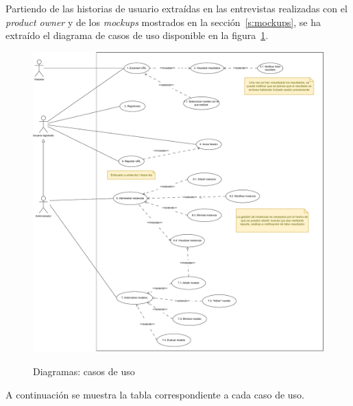 Partiendo de las historias de usuario extraídas en las entrevistas realizadas con el \textit{product owner} y de los \textit{mockups} mostrados en la sección~\ref{s:mockups}, se ha extraído el diagrama de casos de uso disponible en la figura~\ref{b:diagrama-cu}.

\begin{figure}[h]
	\caption{Diagramas: casos de uso}
	\centering
	\includegraphics[width=\textwidth]{../img/anexos/diagrams/cu}
	\label{b:diagrama-cu}
\end{figure}

A continuación se muestra la tabla correspondiente a cada caso de uso.

